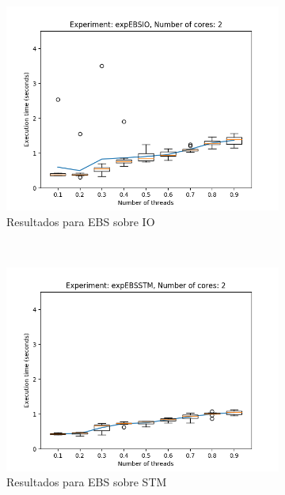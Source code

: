 \clearpage
\begin{figure}[H]
    \centering
    \begin{subfigure}[b]{0.49\textwidth}
        \includegraphics[width=\textwidth]{images/pushPercentages/plots/expEBSIO-2}
        \caption{Resultados para EBS sobre IO}
        \label{subfig:pushPercentages-ebsio-2}
    \end{subfigure}
    ~
    \begin{subfigure}[b]{0.49\textwidth}
        \includegraphics[width=\textwidth]{images/pushPercentages/plots/expEBSSTM-2}
        \caption{Resultados para EBS sobre STM}
        \label{subfig:pushPercentages-ebsstm-2}
    \end{subfigure}
    \begin{subfigure}[b]{0.49\textwidth}

\end{subfigure}
\end{figure}
